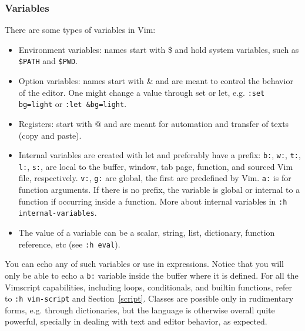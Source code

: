 \documentclass{article}
\newcommand{\tttt}[1]{\texttt{#1}}
\begin{document}
\subsubsection{Variables}
There are some types of variables in Vim:
\begin{itemize}
	\item Environment variables: names start with \$ and hold system
		variables, such as \tttt{\$PATH} and \tttt{\$PWD}.
	\item Option variables: names start with \& and are meant to control the behavior of the editor.
		One might change a value through set or let, e.g.
		\tttt{:set bg=light} or \tttt{:let \&bg=light}.
	\item Registers: start with @ and are meant for automation and transfer of texts (copy and paste).
	\item Internal variables are created with let and preferably have a prefix:
	\tttt{b:}, \tttt{w:}, \tttt{t:}, \tttt{l:}, \tttt{s:},
		are local to the buffer, window, tab page, function, and
		sourced Vim file, respectively.
 \tttt{v:}, \tttt{g:} are global, the first are predefined by Vim.
		\tttt{a:} is for function arguments.
		If there is no prefix, the variable is global or internal to a function if occurring inside a function.
		More about internal variables in \tttt{:h internal-variables}.
	\item The value of a variable can be a scalar, string, list, dictionary, function reference, etc (see \tttt{:h eval}).
\end{itemize}
You can echo any of such variables or use in expressions.
Notice that you will only be able to echo a \tttt{b:} variable inside
the buffer where it is defined.
For all the Vimscript capabilities, including loops, conditionals,
and builtin functions, refer to \tttt{:h vim-script} and Section~\ref{script}.
Classes are possible only in rudimentary forms, e.g. through dictionaries,
but the language is otherwise overall quite powerful,
specially in dealing with text and editor behavior, as expected.
\end{document}
